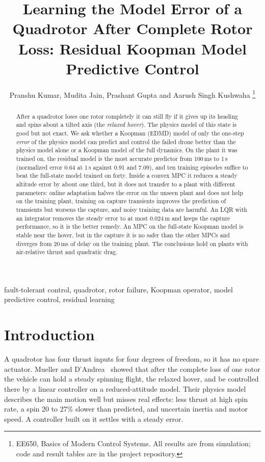 \documentclass[journal]{IEEEtran}
\begin{document}
\title{Learning the Model Error of a Quadrotor After Complete Rotor Loss: Residual Koopman Model Predictive Control}
\author{Pranshu Kumar, Mudita Jain, Prashant Gupta and Aarush Singh Kushwaha%
\thanks{EE650, Basics of Modern Control Systems. All results are from simulation; code and result tables are in the project repository.}}
\maketitle

\begin{abstract}
After a quadrotor loses one rotor completely it can still fly if it gives up its heading and spins about a tilted axis (the \emph{relaxed hover}). The physics model of this state is good but not exact. We ask whether a Koopman (EDMD) model of only the one-step \emph{error} of the physics model can predict and control the failed drone better than the physics model alone or a Koopman model of the full dynamics. On the plant it was trained on, the residual model is the most accurate predictor from 100\,ms to 1\,s (normalized error 0.64 at 1\,s against 0.91 and 7.09), and ten training episodes suffice to beat the full-state model trained on forty. Inside a convex MPC it reduces a steady altitude error by about one third, but it does not transfer to a plant with different parameters: online adaptation halves the error on the unseen plant and does not help on the training plant, training on capture transients improves the prediction of transients but worsens the capture, and noisy training data are harmful. An LQR with an integrator removes the steady error to at most 0.024\,m and keeps the capture performance, so it is the better remedy. An MPC on the full-state Koopman model is stable near the hover, but in the capture it is no safer than the other MPCs and diverges from 20\,ms of delay on the training plant. The conclusions hold on plants with air-relative thrust and quadratic drag.
\end{abstract}

\begin{IEEEkeywords}
fault-tolerant control, quadrotor, rotor failure, Koopman operator, model predictive control, residual learning
\end{IEEEkeywords}

\section{Introduction}
A quadrotor has four thrust inputs for four degrees of freedom, so it has no spare actuator. Mueller and D'Andrea~\cite{mueller2014stability,mueller2016relaxed} showed that after the complete loss of one rotor the vehicle can hold a steady spinning flight, the relaxed hover, and be controlled there by a linear controller on a reduced-attitude model. Their physics model describes the main motion well but misses real effects: less thrust at high spin rate, a spin 20 to 27\% slower than predicted, and uncertain inertia and motor speed. A controller built on it settles with a steady error.
\end{document}
